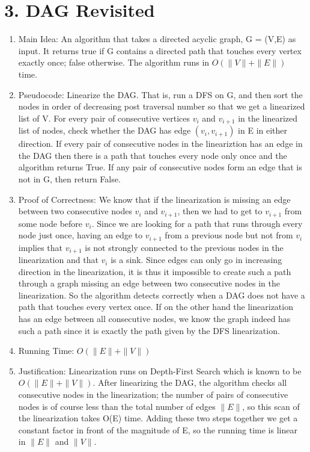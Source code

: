\documentclass[11pt]{article}
\newenvironment{qparts}{\begin{enumerate}[{(}a{)}]}{\end{enumerate}}
\begin{document}
\begin{qparts}
\end{qparts}


\newpage
\section*{3. DAG Revisited}
\begin{enumerate}
\item Main Idea: An algorithm that takes a directed acyclic graph, G = (V,E) as input. It returns true if G contains a directed path that touches every vertex exactly once; false otherwise. The algorithm runs in $O(\|V\|+\|E\|)$ time.
\item Pseudocode: Linearize the DAG. That is, run a DFS on G, and then sort the nodes in order of decreasing post traversal number so that we get a linearized list of {V}. For every pair of consecutive vertices $v_i$ and $v_{i+1}$ in the linearized list of nodes, check whether the DAG has edge $(v_i,v_{i+1})$ in {E} in either direction. If every pair of consecutive nodes in the lineariztion has an edge in the DAG then there is a path that touches every node only once and the algorithm returns True. If any pair of consecutive nodes form an edge that is not in G, then return False.
\item Proof of Correctness: We know that if the linearization is missing an edge between two consecutive nodes $v_i$ and $v_{i+1}$, then we had to get to $v_{i+1}$ from some node before $v_i$. Since we are looking for a path that runs through every node just once, having an edge to $v_{i+1}$ from a previous node but not from $v_i$ implies that $v_{i+1}$ is not strongly connected to the previous nodes in the linearization and that $v_i$ is a sink. Since edges can only go in increasing direction in the linearization, it is thus it impossible to create such a path through a graph missing an edge between two consecutive nodes in the linearization. So the algorithm detects correctly when a DAG does not have a path that touches every vertex once. If on the other hand the linearization has an edge between all consecutive nodes, we know the graph indeed has such a path since it is exactly the path given by the DFS linearization.
\item Running Time: $O(\|E\|+\|V\|)$
\item Justification: Linearization runs on Depth-First Search which is known to be $O(\|E\|+\|V\|)$. After linearizing the DAG, the algorithm checks all consecutive nodes in the linearization; the number of pairs of consecutive nodes is of course less than the total number of edges $\|E\|$, so this scan of the linearization takes O(E) time. Adding these two steps together we get a constant factor in front of the magnitude of E, so the running time is linear in $\|E\|$ and $\|V\|$.
\end{enumerate}
\end{document}
